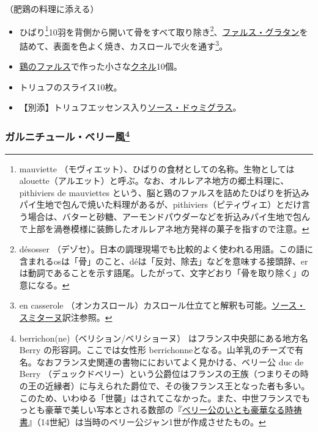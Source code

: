 \begin{recette}


（肥鶏の料理に添える）

\begin{itemize}
\item
  ひばり\footnote{mauviette
    （モヴィエット）、ひばりの食材としての名称。生物としてはalouette（アルエット）と呼ぶ。なお、オルレアネ地方の郷土料理に、
    pithiviers de mauviettes
    という、脳と鶏のファルスを詰めたひばりを折込みパイ生地で包んで焼いた料理があるが、pithiviers（ピティヴィエ）とだけ言う場合は、バターと砂糖、アーモンドパウダーなどを折込みパイ生地で包んで上部を渦巻模様に装飾したオルレアネ地方発祥の菓子を指すので注意。}10羽を背側から開いて骨をすべて取り除き\footnote{désosser
    （デゾセ）。日本の調理現場でも比較的よく使われる用語。この語に含まれるosは「骨」のこと、déは「反対、除去」などを意味する接頭辞、erは動詞であることを示す語尾。したがって、文字どおり「骨を取り除く」の意になる。}、\protect\hyperlink{farce-gratin-c}{ファルス・グラタン}を詰めて、表面を色よく焼き、カスロールで火を通す\footnote{en
    casserole
    （オンカスロール）カスロール仕立てと解釈も可能。\protect\hyperlink{sauce-smitane}{ソース・スミターヌ}訳注参照。}。
\item
  \protect\hyperlink{farce-b}{鶏のファルス}で作った小さな\protect\hyperlink{quenelles}{クネル}10個。
\item
  トリュフのスライス10枚。
\item
  【別添】トリュフエッセンス入り\protect\hyperlink{sauce-demi-glace}{ソース・ドゥミグラス}。
\end{itemize}

\atoaki{}

\hypertarget{garniture-berrichonne}{%
\subsubsection[ガルニチュール・ベリー風]{\texorpdfstring{ガルニチュール・ベリー風\footnote{berrichon(ne)（ベリション/ベリショーヌ）
  はフランス中央部にある地方名 Berry の形容詞。ここでは女性形
  berrichonneとなる。山羊乳のチーズで有名。なおフランス史関連の書物ににおいてよく見かける、ベリー公
  duc de Berry
  （デュックドベリー）という公爵位はフランスの王族（つまりその時の王の近縁者）に与えられた爵位で、その後フランス王となった者も多い。このため、いわゆる「世襲」はされてこなかった。また、中世フランスでもっとも豪華で美しい写本とされる数部の『\href{http://gallica.bnf.fr/ark:/12148/btv1b520004510}{ベリー公のいとも豪華なる時祷書}』（14世紀）は当時のベリー公ジャン1世が作成させたもの。}}{ガルニチュール・ベリー風}}\label{garniture-berrichonne}}


\end{recette}
